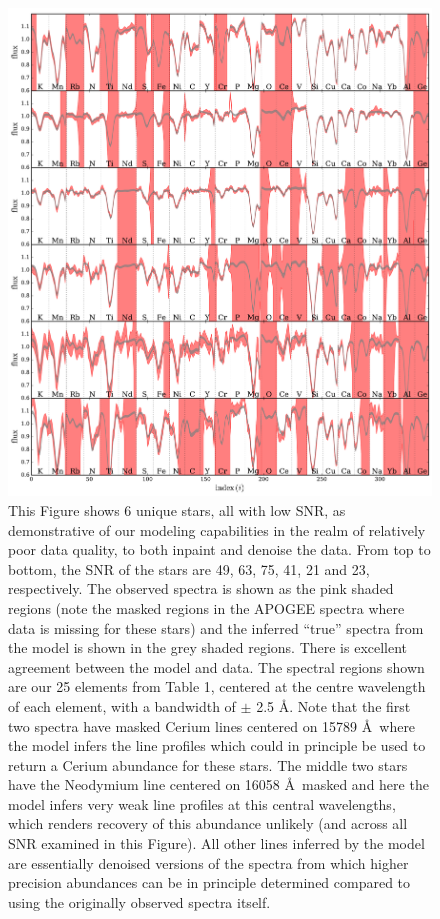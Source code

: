 \documentclass[a4paper,fleqn,usenatbib]{mnras}
\begin{document}
\begin{figure}
	\includegraphics[width=2\columnwidth]{apogee_centers_final_29502_spc_win_wid_1p5_save_spectra.pdf}
    \caption{This Figure shows 6 unique stars, all with low SNR, as demonstrative of our modeling capabilities in the realm of relatively poor data quality, to both inpaint and denoise the data. From top to bottom, the SNR of the stars are 49, 63, 75, 41, 21 and 23, respectively. The observed spectra is shown as the pink shaded regions (note the masked regions in the APOGEE spectra where data is missing for these stars) and the inferred ``true'' spectra from the model is shown in the grey shaded regions. There is excellent agreement between the model and data.  The spectral regions shown are our 25 elements from Table 1, centered at the centre wavelength of each element, with a bandwidth of $\pm$ 2.5 \AA. Note that the first two spectra have masked Cerium lines centered on 15789 \AA\, where the model infers the line profiles which could in principle be used to return a Cerium abundance for these stars. The middle two stars have the Neodymium line centered on 16058 \AA\ masked and here the model infers very weak line profiles at this central wavelengths, which renders recovery of this abundance unlikely (and across all SNR examined in this Figure). All other lines inferred by the model are essentially denoised versions of the spectra from which higher precision abundances can be in principle determined compared to using the originally observed spectra itself. }
    \label{fig:inpainting_denoising_examples}
\end{figure}
\end{document}
